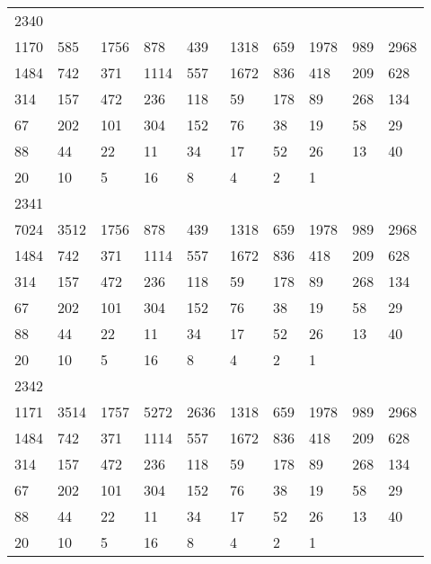 \begin{longtable}{*{10}{l}}
2340&&&&&&&&&\\
1170& 585& 1756& 878& 439& 1318& 659& 1978& 989& 2968\\
1484& 742& 371& 1114& 557& 1672& 836& 418& 209& 628\\
314& 157& 472& 236& 118& 59& 178& 89& 268& 134\\
67& 202& 101& 304& 152& 76& 38& 19& 58& 29\\
88& 44& 22& 11& 34& 17& 52& 26& 13& 40\\
20& 10& 5& 16& 8& 4& 2& 1& \\

2341&&&&&&&&&\\
7024& 3512& 1756& 878& 439& 1318& 659& 1978& 989& 2968\\
1484& 742& 371& 1114& 557& 1672& 836& 418& 209& 628\\
314& 157& 472& 236& 118& 59& 178& 89& 268& 134\\
67& 202& 101& 304& 152& 76& 38& 19& 58& 29\\
88& 44& 22& 11& 34& 17& 52& 26& 13& 40\\
20& 10& 5& 16& 8& 4& 2& 1& \\

2342&&&&&&&&&\\
1171& 3514& 1757& 5272& 2636& 1318& 659& 1978& 989& 2968\\
1484& 742& 371& 1114& 557& 1672& 836& 418& 209& 628\\
314& 157& 472& 236& 118& 59& 178& 89& 268& 134\\
67& 202& 101& 304& 152& 76& 38& 19& 58& 29\\
88& 44& 22& 11& 34& 17& 52& 26& 13& 40\\
20& 10& 5& 16& 8& 4& 2& 1& \\


\end{longtable}
